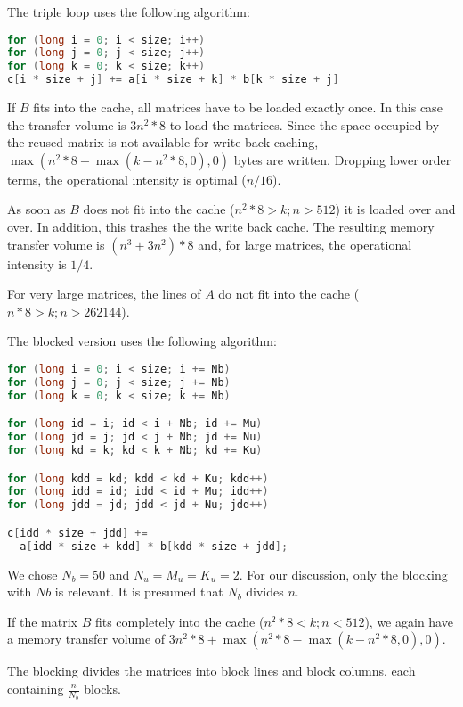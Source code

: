 \documentclass[a4paper,12pt]{report}
\begin{document}
The triple loop uses the following algorithm:

\begin{minipage}{\textwidth-18pt}
\begin{lstlisting}[language=C] 
for (long i = 0; i < size; i++) 
for (long j = 0; j < size; j++) 
for (long k = 0; k < size; k++) 
c[i * size + j] += a[i * size + k] * b[k * size + j]
\end{lstlisting}
\end{minipage}

If $B$ fits into the cache, all matrices have to be loaded exactly once. In this
case the transfer volume is $3n^2*8$ to load the matrices. Since the space
occupied by the reused matrix is not available for write back caching,
$\max(n^2*8-\max(k-n^2*8,0),0)$ bytes are written. Dropping lower order terms,
the operational intensity is optimal ($n/16$). 

As soon as $B$ does not fit into the cache ($n^2*8>k;n>512$) it is loaded over
and over. In addition, this trashes the the write back cache. The resulting
memory transfer volume is $(n^3+3n^2)*8$ and, for large matrices, the
operational intensity is $1/4$.

For very large matrices, the lines of $A$ do not fit into the cache 
($n*8>k;n>262144$). 
 
The blocked version uses the following algorithm:

\begin{lstlisting}[language=C] 
for (long i = 0; i < size; i += Nb)
for (long j = 0; j < size; j += Nb)
for (long k = 0; k < size; k += Nb)

for (long id = i; id < i + Nb; id += Mu)
for (long jd = j; jd < j + Nb; jd += Nu)
for (long kd = k; kd < k + Nb; kd += Ku)

for (long kdd = kd; kdd < kd + Ku; kdd++)
for (long idd = id; idd < id + Mu; idd++)
for (long jdd = jd; jdd < jd + Nu; jdd++)

c[idd * size + jdd] += 
  a[idd * size + kdd] * b[kdd * size + jdd];
\end{lstlisting}

We chose $N_b=50$ and $N_u=M_u=K_u=2$.
For our discussion, only the blocking with $Nb$ is relevant. It is presumed that
$N_b$ divides $n$. 

If the matrix $B$ fits completely into the cache ($n^2*8<k;n<512$), we again
have a memory transfer volume of $3n^2*8+\max(n^2*8-\max(k-n^2*8,0),0)$. 

The blocking divides the matrices into block lines and block columns, each
containing $\frac{n}{N_b}$ blocks.
\end{document}
